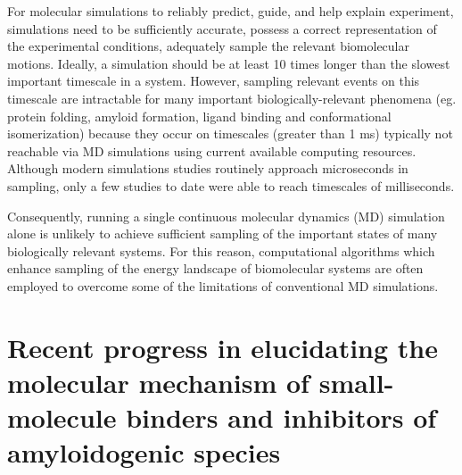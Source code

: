 For molecular simulations to reliably predict, guide, and help explain experiment, simulations need to be sufficiently accurate,  possess a correct representation of the experimental conditions, adequately sample the relevant biomolecular motions.\cite{Mobley:2011ks} Ideally, a simulation should be at least 10 times longer than the slowest important timescale in a system.\cite{Zuckerman:2011dz} However, sampling relevant events on this timescale are intractable for many important biologically-relevant phenomena (eg. protein folding, amyloid formation, ligand binding and conformational isomerization) because they occur on timescales (greater than 1 ms) typically not reachable via MD simulations using current available computing resources.  Although modern simulations studies routinely approach microseconds in sampling, only a few studies to date were able to reach timescales of milliseconds.\cite{Dror:2012cs,Shan:2011bo,LindorffLarsen:2011gl}

Consequently, running a single continuous molecular dynamics (MD) simulation alone is unlikely to achieve sufficient sampling of the important states of many biologically relevant systems. For this reason, computational algorithms which enhance sampling of the energy landscape of biomolecular systems are often employed to overcome some of the limitations of conventional MD simulations.




\section{Recent progress in elucidating the molecular mechanism of small-molecule binders and inhibitors of amyloidogenic species}



